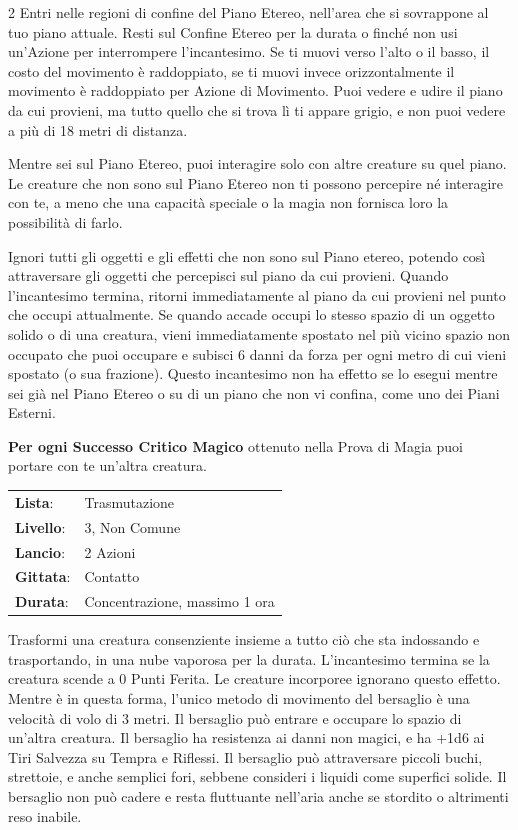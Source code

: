 \begin{multicols}{2}
Entri nelle regioni di confine del Piano Etereo, nell'area che si sovrappone al tuo piano attuale. Resti sul Confine Etereo per la durata o finché non usi un'Azione per interrompere l'incantesimo. Se ti muovi verso l'alto o il basso, il costo del movimento è raddoppiato, se ti muovi invece orizzontalmente il movimento è raddoppiato per Azione di Movimento. Puoi vedere e udire il piano da cui provieni, ma tutto quello che si trova lì ti appare grigio, e non puoi vedere a più di 18 metri di distanza.

Mentre sei sul Piano Etereo, puoi interagire solo con altre creature su quel piano. Le creature che non sono sul Piano Etereo non ti possono percepire né interagire con te, a meno che una capacità speciale o la magia non fornisca loro la possibilità di farlo.

Ignori tutti gli oggetti e gli effetti che non sono sul Piano etereo, potendo così attraversare gli oggetti che percepisci sul piano da cui provieni. Quando l'incantesimo termina, ritorni immediatamente al piano da cui provieni nel punto che occupi attualmente. Se quando accade occupi lo stesso spazio di un oggetto solido o di una creatura, vieni immediatamente spostato nel più vicino spazio non occupato che puoi occupare e subisci 6 danni da forza per ogni metro di cui vieni spostato (o sua frazione). Questo incantesimo non ha effetto se lo esegui mentre sei già nel Piano Etereo o su di un piano che non vi confina, come uno dei Piani Esterni.

\textbf{Per ogni Successo Critico Magico} ottenuto nella Prova di Magia puoi portare con te un'altra creatura.

\noindent\begin{tabularx}{\linewidth}{p{1.9cm}X}
	\rowcolor{gray!20}\textbf{Lista}: & Trasmutazione \\
	\textbf{Livello}: & 3, Non Comune \\
	\rowcolor{gray!20}\textbf{Lancio}: & 2 Azioni \\
	\textbf{Gittata}: & Contatto \\
	\rowcolor{gray!20}\textbf{Durata}: & Concentrazione, massimo 1 ora \\
\end{tabularx}\smallskip

Trasformi una creatura consenziente insieme a tutto ciò che sta indossando e trasportando, in una nube vaporosa per la durata. L'incantesimo termina se la creatura scende a 0 Punti Ferita. Le creature incorporee ignorano questo effetto. Mentre è in questa forma, l'unico metodo di movimento del bersaglio è una velocità di volo di 3 metri. Il bersaglio può entrare e occupare lo spazio di un'altra creatura. Il bersaglio ha resistenza ai danni non magici, e ha +1d6 ai Tiri Salvezza su Tempra e Riflessi. Il bersaglio può attraversare piccoli buchi, strettoie, e anche semplici fori, sebbene consideri i liquidi come superfici solide. Il bersaglio non può cadere e resta fluttuante nell'aria anche se stordito o altrimenti reso inabile.


\end{multicols}
